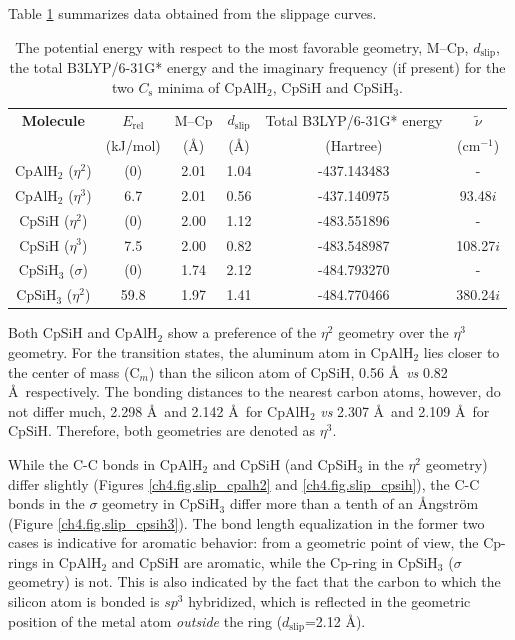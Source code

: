 Table \ref{ch4.tab.slip} summarizes data obtained from the slippage curves.
\begin{table}[htbp]
\center
\caption{The potential energy with respect to the most favorable geometry, M--Cp, $d_\mathrm{slip}$, the total B3LYP/6-31G* energy and the imaginary frequency (if present) for the two $C_\mathrm{s}$ minima of CpAlH$_2$, CpSiH and CpSiH$_3$.}
\begin{tabular}{|c|c|c|c|c|c|}
\hline
\textbf{Molecule}&
$E_\mathrm{rel}$&
M--Cp&
$d_\mathrm{slip}$&Total B3LYP/6-31G* energy&
$\tilde{\nu}$\\
&(kJ/mol)&(\AA)&(\AA)&(Hartree)& (cm$^{-1}$)\\
\hline
CpAlH$_2$ ($\eta^{2}$) & (0)  & 2.01 & 1.04 & -437.143483 & -\\
CpAlH$_2$ ($\eta^{3}$) & 6.7  & 2.01 & 0.56 & -437.140975 & 93.48$i$ \\
CpSiH ($\eta^{2}$) & (0)  & 2.00 & 1.12 & -483.551896 & -\\
CpSiH ($\eta^{3}$) & 7.5  & 2.00 & 0.82 & -483.548987 & 108.27$i$ \\
CpSiH$_3$ ($\sigma$) & (0)  & 1.74 & 2.12 & -484.793270 & - \\
CpSiH$_3$ ($\eta^{2}$) & 59.8 & 1.97 & 1.41 & -484.770466 & 380.24$i$ \\
\hline
\end{tabular}
\label{ch4.tab.slip}
\end{table}
Both CpSiH and CpAlH$_2$ show a preference of the $\eta^{2}$ geometry over the $\eta^{3}$ geometry. For the transition states, the aluminum atom in CpAlH$_2$ lies closer to the center of mass (C$_m$) than the silicon atom of CpSiH, 0.56 \AA\ \textit{vs} 0.82 \AA\ respectively. The bonding distances to the nearest carbon atoms, however, do not differ much, 2.298 \AA\ and 2.142 \AA\ for CpAlH$_2$ \textit{vs} 2.307 \AA\ and 2.109 \AA\ for CpSiH. Therefore, both geometries are denoted as $\eta^{3}$.

While the C-C bonds in CpAlH$_2$ and CpSiH (and CpSiH$_3$ in the $\eta^2$ geometry) differ slightly (Figures \ref{ch4.fig.slip_cpalh2} and \ref{ch4.fig.slip_cpsih}), the C-C bonds in the $\sigma$ geometry in CpSiH$_3$ differ more than a tenth of an \AA ngstr\"{o}m (Figure \ref{ch4.fig.slip_cpsih3}). The bond length equalization in the former two cases is indicative for aromatic behavior: from a geometric point of view, the Cp-rings in CpAlH$_2$ and CpSiH are aromatic, while the Cp-ring in CpSiH$_3$ ($\sigma$ geometry) is not. This is also indicated by the fact that the carbon to which the silicon atom is bonded is $sp^3$ hybridized, which is reflected in the geometric position of the metal atom \textit{outside} the ring ($d_\mathrm{slip}$=2.12 \AA). 

